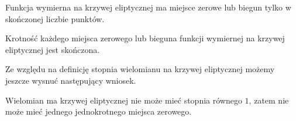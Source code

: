 \begin{corollary}
Funkcja wymierna na krzywej eliptycznej ma miejsce zerowe lub biegun
tylko w skończonej liczbie punktów.
\end{corollary}

\begin{corollary}
Krotność każdego miejsca zerowego lub bieguna
funkcji wymiernej na krzywej eliptycznej
jest skończona.
\end{corollary}

Ze względu na definicję stopnia wielomianu na krzywej eliptycznej
możemy jeszcze wysnuć następujący wniosek.

\begin{corollary}\label{poly_no_single_zero_corollary}
Wielomian ma krzywej eliptycznej nie może mieć stopnia równego $1$,
zatem nie może mieć jednego jednokrotnego miejsca zerowego.
\end{corollary}
